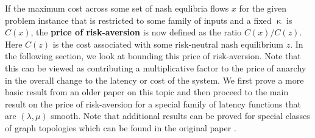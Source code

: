 If the maximum cost across some set of nash equlibria flows $x$ for the given problem instance 
that is restricted to some family of inputs and a fixed $\upkappa$ is $C(x)$, the {\textbf{price of risk-aversion}} is now defined as the
ratio $C(x)/C(z)$. Here $C(z)$ is the cost associated with some risk-neutral nash equilibrium $z$. 
In the following section, we look at bounding this price of risk-aversion. Note that this can be viewed as contributing a 
multiplicative factor to the price of anarchy in the overall change to the latency or cost of the system. We first prove a 
more basic result from an older paper on this topic \cite{risk-averse-background} and then proceed to the main result on the price
of risk-aversion for 
a special family of latency functions that are $(\lambda, \mu)$ smooth. Note that additional results can be proved for special classes
of graph topologies which can be found in the original paper \cite{risk-averse}.




